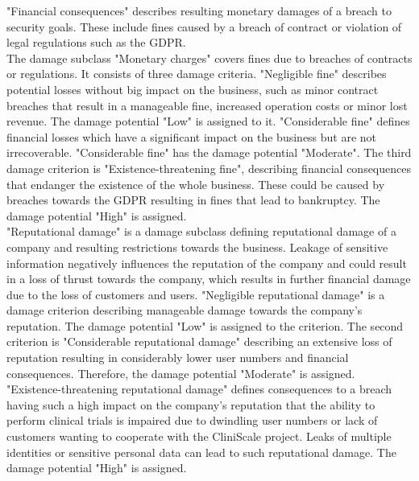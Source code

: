 "Financial consequences" describes resulting monetary damages of a breach to security goals. These include fines caused by a breach of contract or violation of legal regulations such as the GDPR. \\
The damage subclass "Monetary charges" covers fines due to breaches of contracts or regulations. It consists of three damage criteria. "Negligible fine" describes potential losses without big impact on the business, such as minor contract breaches that result in a manageable fine, increased operation costs or minor lost revenue. The damage potential "Low" is assigned to it. "Considerable fine" defines financial losses which have a significant impact on the business but are not irrecoverable. "Considerable fine" has the damage potential "Moderate". The third damage criterion is "Existence-threatening fine", describing financial consequences that endanger the existence of the whole business. These could be caused by breaches towards the GDPR resulting in fines that lead to bankruptcy. The damage potential "High" is assigned.\\
"Reputational damage" is a damage subclass defining reputational damage of a company and resulting restrictions towards the business. Leakage of sensitive information negatively influences the reputation of the company and could result in a loss of thrust towards the company, which results in further financial damage due to the loss of customers and users. "Negligible reputational damage" is a damage criterion describing manageable damage towards the company's reputation. The damage potential "Low" is assigned to the criterion. The second criterion is "Considerable reputational damage" describing an extensive loss of reputation resulting in considerably lower user numbers and financial consequences. Therefore, the damage potential "Moderate" is assigned. "Existence-threatening reputational damage" defines consequences to a breach having such a high impact on the company's reputation that the ability to perform clinical trials is impaired due to dwindling user numbers or lack of customers wanting to cooperate with the CliniScale project. Leaks of multiple identities or sensitive personal data can lead to such reputational damage. The damage potential "High" is assigned. 

